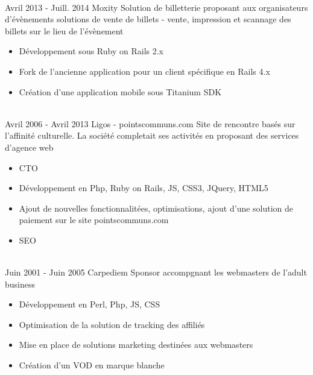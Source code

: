 \documentclass[letterpaper]{twentysecondcv} %
\begin{document}
\begin{twenty}

     \\   
    \twentyitem
   		{Avril 2013 - }
		{Juill. 2014}
        {Moxity}
        {}
        {Solution de billetterie proposant aux organisateurs d'évènements solutions de vente de billets - vente, impression et scannage des billets sur le lieu de l'évènement}
        {
        {\begin{itemize}
        \item Développement sous Ruby on Rails 2.x
        \item Fork de l'ancienne application pour un client spécifique en Rails 4.x
        \item Création d'une application mobile sous Titanium SDK


    \end{itemize}}
        }

\end{twenty}

\begin{twenty}
    
     \\   
    \twentyitem
   		{Avril 2006 - }
		{Avril 2013}
        {Ligos - pointscommuns.com}
        {}
        {Site de rencontre basés sur l'affinité culturelle. La société completait ses activités en proposant des services d'agence web}
        {
        {\begin{itemize}
        \item CTO
        \item Développement en Php, Ruby on Rails, JS, CSS3, JQuery, HTML5
        \item Ajout de nouvelles fonctionnalitées, optimisations, ajout d'une solution de paiement sur le site \mbox{pointscommuns.com}
        \item SEO


    \end{itemize}}
        }
        
\end{twenty}

\begin{twenty}        
    
     \\   
    \twentyitem
   		{Juin 2001 - }
		{Juin 2005}
        {Carpediem}
        {}
        {Sponsor accompgnant les webmasters de l'adult business}
        {
        {\begin{itemize}
        \item Développement en Perl, Php, JS, CSS
        \item Optimisation de la solution de tracking des affiliés
        \item Mise en place de solutions marketing destinées aux webmasters
        \item Création d'un VOD en marque blanche

    \end{itemize}}
        }

\end{twenty}
\end{document}
